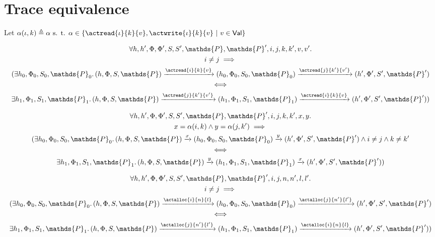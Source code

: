 \section{Trace equivalence}

Let $\alpha(\iota, k) \triangleq \alpha \text{ s. t. } \alpha \in \{ \actread{\iota}{k}{v}, \actwrite{\iota}{k}{v}\ |\ v \in \mathsf{Val} \}$

\lem
\begin{gather*}
	\forall h, h', \Phi, \Phi', S, S', \mathds{P}, \mathds{P}', i, j, k, k', v, v' \ldotp \\
	 i \neq j \implies
	 \\
	(\exists h_0, \Phi_0, S_0, \mathds{P}_0 \ldotp 
	(h, \Phi, S, \mathds{P}) \xrightarrow{\actread{i}{k}{v}} (h_0, \Phi_0, S_0, \mathds{P}_0)  \xrightarrow{\actread{j}{k'}{v'}} (h', \Phi', S', \mathds{P}') \\
	\iff \\
	\exists h_1, \Phi_1, S_1, \mathds{P}_1 \ldotp
	(h, \Phi, S, \mathds{P}) \xrightarrow{\actread{j}{k'}{v'}} (h_1, \Phi_1, S_1, \mathds{P}_1) \xrightarrow{\actread{i}{k}{v}} (h', \Phi', S', \mathds{P}'))
\end{gather*}

\lem
\begin{gather*}
	\forall h, h', \Phi, \Phi', S, S', \mathds{P}, \mathds{P}', i, j, k, k', x, y \ldotp \\
	x = \alpha(i, k) \land y = \alpha(j, k') \implies \\
	(\exists h_0, \Phi_0, S_0, \mathds{P}_0 \ldotp
	(h, \Phi, S, \mathds{P}) \xrightarrow{x} (h_0, \Phi_0, S_0, \mathds{P}_0)  \xrightarrow{y} (h', \Phi', S', \mathds{P}') \land i \neq j \land k \neq k' \\
	\iff \\
	\exists h_1, \Phi_1, S_1, \mathds{P}_1 \ldotp
	(h, \Phi, S, \mathds{P}) \xrightarrow{y} (h_1, \Phi_1, S_1, \mathds{P}_1) \xrightarrow{x} (h', \Phi', S', \mathds{P}'))
\end{gather*}

\lem
\begin{gather*}
	\forall h, h', \Phi, \Phi', S, S', \mathds{P}, \mathds{P}', i, j, n, n', l, l' \ldotp \\
	i \neq j \implies \\
	(\exists h_0, \Phi_0, S_0, \mathds{P}_0 \ldotp 
	(h, \Phi, S, \mathds{P}) \xrightarrow{\actalloc{i}{n}{l}} (h_0, \Phi_0, S_0, \mathds{P}_0)  \xrightarrow{\actalloc{j}{n'}{l'}} (h', \Phi', S', \mathds{P}') \\
	\iff \\
	\exists h_1, \Phi_1, S_1, \mathds{P}_1 \ldotp
	(h, \Phi, S, \mathds{P}) \xrightarrow{\actalloc{j}{n'}{l'}} (h_1, \Phi_1, S_1, \mathds{P}_1) \xrightarrow{\actalloc{i}{n}{l}} (h', \Phi', S', \mathds{P}'))
\end{gather*}

